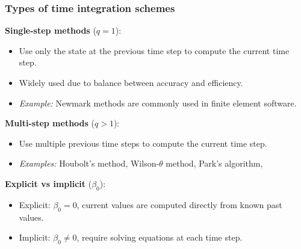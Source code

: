 \documentclass[aspectratio=169]{beamer}
\begin{document}
\begin{frame}
  \frametitle{Types of time integration schemes}
  \textbf{Single-step methods} (\(q = 1\)):
  \begin{itemize}
    \item Use only the state at the previous time step to compute the current time step.
    \item Widely used due to balance between accuracy and efficiency.
    \item \emph{Example:} Newmark methods are commonly used in finite element software.
  \end{itemize}
  \textbf{Multi-step methods} (\(q > 1\)):
  \begin{itemize}
    \item Use multiple previous time steps to compute the current time step.
    \item \emph{Examples:} Houbolt’s method, Wilson-\(\theta\) method, Park’s algorithm,
  \end{itemize}
  \textbf{Explicit vs implicit} ($\beta_0$):
  \begin{itemize}
    \item Explicit: \( \beta_0 = 0 \), current values are computed directly from known past values.
    \item Implicit: \( \beta_0 \ne 0 \), require solving equations at each time step.
  \end{itemize}
\end{frame}
\end{document}
